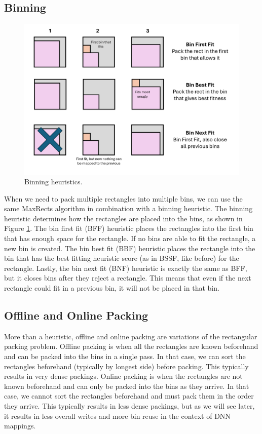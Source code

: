 \subsection{Binning}

\begin{figure}[htbp]
    \centering
    \includegraphics[width=\textwidth]{images/marp/binning.png}
    \caption{Binning heuristics.}
    \label{fig:binning}
\end{figure}

When we need to pack multiple rectangles into multiple bins, we can use the same MaxRects algorithm in combination with a binning heuristic. The binning heuristic determines how the rectangles are placed into the bins, as shown in Figure \ref{fig:binning}. The bin first fit (BFF) heuristic places the rectangles into the first bin that has enough space for the rectangle. If no bins are able to fit the rectangle, a new bin is created. The bin best fit (BBF) heuristic places the rectangle into the bin that has the best fitting heuristic score (as in BSSF, like before) for the rectangle. Lastly, the bin next fit (BNF) heuristic is exactly the same as BFF, but it closes bins after they reject a rectangle. This means that even if the next rectangle could fit in a previous bin, it will not be placed in that bin.

\subsection{Offline and Online Packing}

More than a heuristic, offline and online packing are variations of the rectangular packing problem. Offline packing is when all the rectangles are known beforehand and can be packed into the bins in a single pass. In that case, we can sort the rectangles beforehand (typically by longest side) before packing. This typically results in very dense packings. Online packing is when the rectangles are not known beforehand and can only be packed into the bins as they arrive. In that case, we cannot sort the rectangles beforehand and must pack them in the order they arrive. This typically results in less dense packings, but as we will see later, it results in less overall writes and more bin reuse in the context of DNN mappings.

